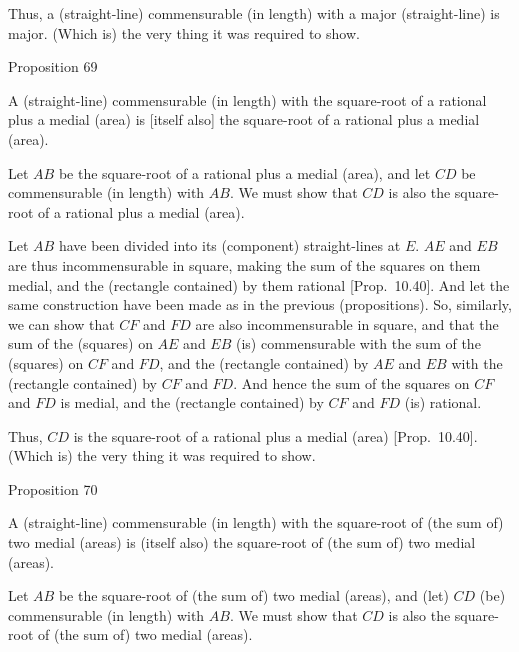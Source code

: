 Thus, a (straight-line) commensurable (in length) with a major
(straight-line) is major. (Which is) the very thing it was required to show.


\begin{center}
{\large Proposition 69}
\end{center}

A (straight-line) commensurable (in length)
with the square-root of a rational plus a medial (area) is [itself also]
the square-root of a rational plus a medial (area).

\epsfysize=0.7in 
\centerline{}

Let $AB$ be the square-root of a rational plus a medial (area), 
and let $CD$ be commensurable (in length) with $AB$. We must  show
that $CD$ is also the square-root of a rational plus a medial (area).

Let $AB$ have been divided into its (component) straight-lines at $E$.
$AE$ and $EB$ are thus incommensurable in square, making 
the sum of the squares on them medial, and the (rectangle contained)
by them rational [Prop.~10.40]. And let the
same construction have been made as in the previous (propositions).
So, similarly, we can show that $CF$ and $FD$ are also incommensurable
in square, and that the sum of the (squares) on $AE$ and $EB$
(is) commensurable with the sum of the (squares) on $CF$ and $FD$,
and the (rectangle contained) by $AE$ and $EB$ with the
(rectangle contained) by $CF$ and $FD$. And hence the sum of the
squares on $CF$ and $FD$ is medial, and the (rectangle contained) by
$CF$ and $FD$ (is) rational.

Thus, $CD$ is the square-root of a rational plus a medial (area) [Prop.~10.40]. (Which is) the very thing it was required to show.


\begin{center}
{\large Proposition 70}
\end{center}

A (straight-line) commensurable (in length)
with the square-root of (the sum of) two medial (areas) is (itself also)
the square-root of (the sum of) two medial (areas).

\epsfysize=0.7in 
\centerline{}

Let $AB$ be the square-root of (the sum of) two medial (areas),
and (let) $CD$ (be) commensurable (in length) with $AB$. We must show that
$CD$ is also the square-root of (the sum of) two medial (areas).

